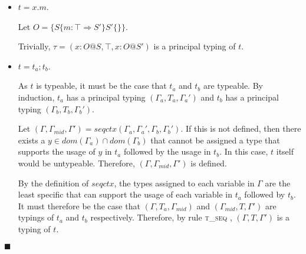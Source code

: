 \documentclass[preprint]{sigplanconf}
\newcommand{\lemref}[1]{Lemma \ref{#1}}
\newcommand{\tlet}{\textsc{t\_let} }
\newcommand{\tseq}{\textsc{t\_seq} }
\newcommand{\qed}{$\blacksquare$}
\newenvironment{proof}{\vspace{1ex}\noindent{\bf Proof}\hspace{0.5em}}
  {\hfill\qed\vspace{1ex}}
\begin{document}
\begin{proof}
\begin{itemize}
By the definition of $\mathit{seqctx}$ it must be the case that
$(\Gamma, T_v, \Gamma_{mid})$ is a typing of 
$t_v$. By \lemref{lem:upgrade} there exists a $T_v' <: T_v$ such that
$(\Gamma, T_v', \Gamma_{mid})$ is a typing of $t_v$.

If $x \in \Gamma_b$, let $T_x = \Gamma_b(x)$ and $T_x' = \Gamma_b'(x)$.
If $x \notin \Gamma_b$ (i.e. $x$ is not used in the body of the let binding), 
let $T_x = T_x' = \top$. Either directly or by \lemref{lem:weakening},
$((\Gamma_b'', x : T_x), T_b, (\Gamma_b''', x : T_x'))$ is a typing of $t'$.

In order for $t$ to be typeable, it must be the case that $T_v' <: T_x$.
Let $\Gamma_{mid}' = \Gamma_{mid}, x : T_v'$.
By \lemref{lem:upgrade}, there exists a $T_b' <: T_b$ and $T_x'' <: T_x'$ such that
$(\Gamma_{mid}', T_b', (\Gamma_{out}, x : T_x''))$ is a typing of $t_b$.

By rule \tlet it follows that $(\Gamma_{in}, T_b', \Gamma_{out})$ is a
typing of $t$. This typing is principal.



\item $t = x.m$.

Let $O = \{ S \{ m : \top \Rightarrow S' \} S' \{ \} \}$.

Trivially, $\tau = (x : O@S, \top,  x : O@S')$
is a principal typing of $t$.

\item $t = t_a; t_b$.

As $t$ is typeable, it must be the case that $t_a$ and $t_b$ are typeable.
By induction, $t_a$ has a principal typing $(\Gamma_a, T_a, \Gamma_a')$ and
$t_b$ has a principal typing $(\Gamma_b, T_b, \Gamma_b')$.

Let $(\Gamma, \Gamma_{mid}, \Gamma') = \mathit{seqctx}(\Gamma_a, \Gamma_a', \Gamma_b, \Gamma_b')$.
If this is not defined, then there exists a $y \in dom(\Gamma_a) \cap dom(\Gamma_b)$
that cannot be assigned a type that supports the usage of $y$ in $t_a$
followed by the usage in $t_b$. 
In this case, $t$ itself would be untypeable. Therefore, 
$(\Gamma, \Gamma_{mid}, \Gamma')$ is defined.

By the definition of $\mathit{seqctx}$, the types assigned to each variable
in $\Gamma$ are the least specific that can support the usage of each variable
in $t_a$ followed by $t_b$. It must therefore be the case 
that $(\Gamma, T_a, \Gamma_{mid})$ and $(\Gamma_{mid}, T, \Gamma')$ are typings
of $t_a$ and $t_b$ respectively. Therefore, by rule \tseq,
$(\Gamma, T, \Gamma')$ is a typing of $t$.


\end{itemize}
\end{proof}
\end{document}
